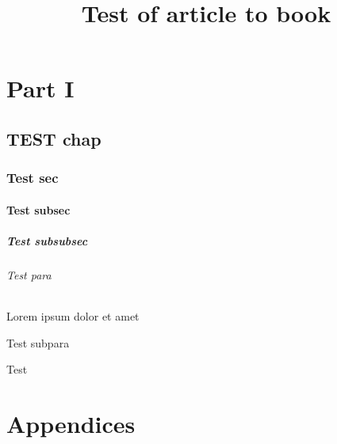 \documentclass[10pt]{article}
\title{Test of article to book}
\begin{document}
    \tableofcontents
    
    
    \part{Part I}
    
    \chapter{TEST chap}
    \section{Test sec}
    \subsection{Test subsec}
    \subsubsection{Test subsubsec}
    \paragraph{Test para} Lorem ipsum dolor et amet
    \subparagraph{Test subpara}
    Test
    \part*{Appendices}
\end{document}
